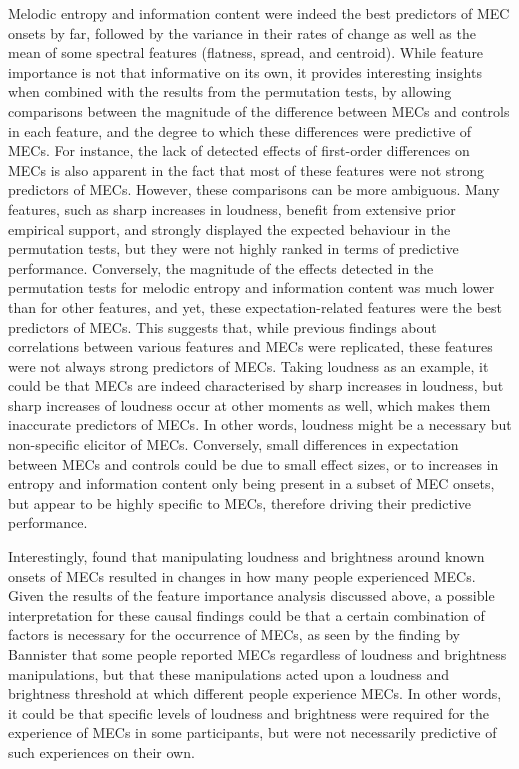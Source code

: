 Melodic entropy and information content were indeed the best predictors of MEC onsets by far, followed by the variance in their rates of change as well as the mean of some spectral features (flatness, spread, and centroid). While feature importance is not that informative on its own, it provides interesting insights when combined with the results from the permutation tests, by allowing comparisons between the magnitude of the difference between MECs and controls in each feature, and the degree to which these differences were predictive of MECs. For instance, the lack of detected effects of first-order differences on MECs is also apparent in the fact that most of these features were not strong predictors of MECs. However, these comparisons can be more ambiguous. Many features, such as sharp increases in loudness, benefit from extensive prior empirical support, and strongly displayed the expected behaviour in the permutation tests, but they were not highly ranked in terms of predictive performance. Conversely, the magnitude of the effects detected in the permutation tests for melodic entropy and information content was much lower than for other features, and yet, these expectation-related features were the best predictors of MECs. This suggests that, while previous findings about correlations between various features and MECs were replicated, these features were not always strong predictors of MECs. Taking loudness as an example, it could be that MECs are indeed characterised by sharp increases in loudness, but sharp increases of loudness occur at other moments as well, which makes them inaccurate predictors of MECs. In other words, loudness might be a necessary but non-specific elicitor of MECs. Conversely, small differences in expectation between MECs and controls could be due to small effect sizes, or to increases in entropy and information content only being present in a subset of MEC onsets, but appear to be highly specific to MECs, therefore driving their predictive performance.

Interestingly, \textcite{bannister2020b} found that manipulating loudness and brightness around known onsets of MECs resulted in changes in how many people experienced MECs. Given the results of the feature importance analysis discussed above, a possible interpretation for these causal findings could be that a certain combination of factors is necessary for the occurrence of MECs, as seen by the finding by Bannister that some people reported MECs regardless of loudness and brightness manipulations, but that these manipulations acted upon a loudness and brightness threshold at which different people experience MECs. In other words, it could be that specific levels of loudness and brightness were required for the experience of MECs in some participants, but were not necessarily predictive of such experiences on their own.

